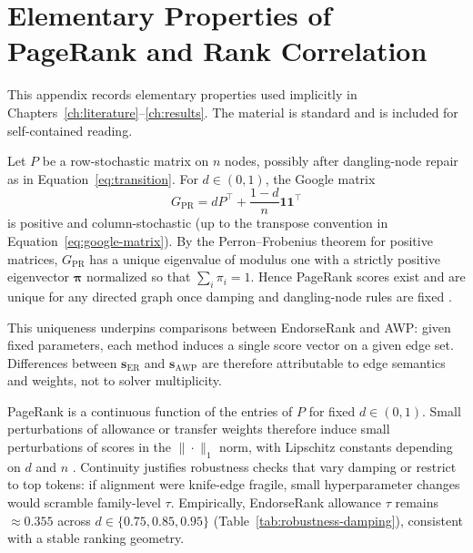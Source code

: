 \section{Elementary Properties of PageRank and Rank Correlation}
\label{ch:appendix-theory}

This appendix records elementary properties used implicitly in Chapters~\ref{ch:literature}--\ref{ch:results}. The material is standard  and is included for self-contained reading.


Let $P$ be a row-stochastic matrix on $n$ nodes, possibly after dangling-node repair as in Equation~\eqref{eq:transition}. For $d\in(0,1)$, the Google matrix
\[
G_{\mathrm{PR}}=d P^{\top}+\frac{1-d}{n}\mathbf{1}\mathbf{1}^{\top}
\]
is positive and column-stochastic (up to the transpose convention in Equation~\eqref{eq:google-matrix}). By the Perron--Frobenius theorem for positive matrices, $G_{\mathrm{PR}}$ has a unique eigenvalue of modulus one with a strictly positive eigenvector $\boldsymbol{\pi}$ normalized so that $\sum_i\pi_i=1$. Hence PageRank scores exist and are unique for any directed graph once damping and dangling-node rules are fixed .

This uniqueness underpins comparisons between EndorseRank and AWP: given fixed parameters, each method induces a single score vector on a given edge set. Differences between $\mathbf{s}_{\mathrm{ER}}$ and $\mathbf{s}_{\mathrm{AWP}}$ are therefore attributable to edge semantics and weights, not to solver multiplicity.


PageRank is a continuous function of the entries of $P$ for fixed $d\in(0,1)$. Small perturbations of allowance or transfer weights therefore induce small perturbations of scores in the $\|\cdot\|_1$ norm, with Lipschitz constants depending on $d$ and $n$ . Continuity justifies robustness checks that vary damping or restrict to top tokens: if alignment were knife-edge fragile, small hyperparameter changes would scramble family-level $\tau$. Empirically, EndorseRank allowance $\tau$ remains $\approx 0.355$ across $d\in\{0.75,0.85,0.95\}$ (Table~\ref{tab:robustness-damping}), consistent with a stable ranking geometry.


